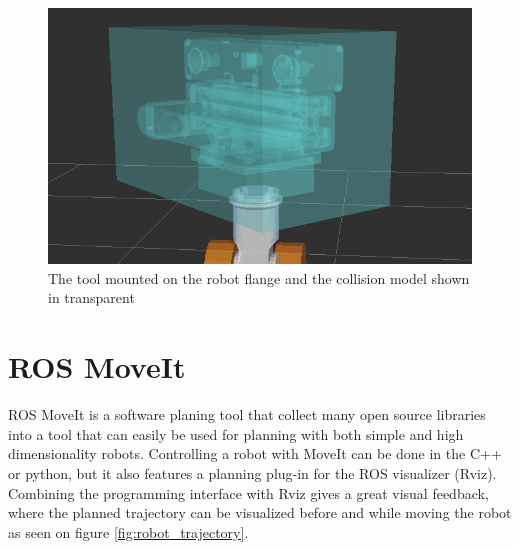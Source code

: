 \begin{figure}[htb]
	\begin{center}
		\includegraphics[scale=0.5,trim=0 0 0 0]{graphics/05_robotics/tool_collision_model.png}%
		\caption{The tool mounted on the robot flange and the collision model shown in transparent}
		\label{fig:tool_collision_model}
	\end{center}
\end{figure}

\section{ROS MoveIt}
\label{sec:moveit}
ROS MoveIt is a software planing tool that collect many open source libraries into a tool that can easily be used for planning with both simple and high dimensionality robots.  Controlling a robot with MoveIt can be done in the C++ or python, but it also features a planning plug-in for the ROS visualizer (Rviz). Combining the programming interface with Rviz gives a great visual feedback, where the planned trajectory can be visualized before and while moving the robot as seen on figure \ref{fig:robot_trajectory}.


